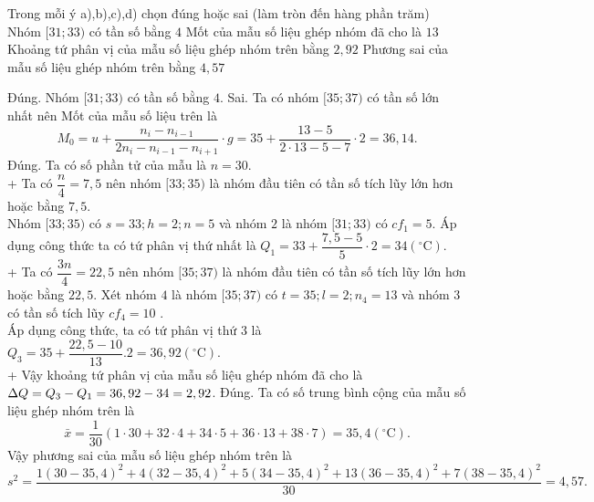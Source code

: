 \begin{ex}
	Trong mỗi ý a),b),c),d) chọn đúng hoặc sai (làm tròn đến hàng phần trăm)
	\choiceTF
	{\True Nhóm $[31 ; 33)$ có tần số bằng $4$}
	{Mốt của mẫu số liệu ghép nhóm đã cho là $13$}
	{\True Khoảng tứ phân vị của mẫu số liệu ghép nhóm trên bằng $2{,}92$}
	{\True  Phương sai của mẫu số liệu ghép nhóm trên bằng $4{,}57$}
	\loigiai
	{
		\begin{itemchoice}
			\itemch  Đúng. Nhóm $[31 ; 33)$ có tần số bằng $4$.
			\itemch  Sai. Ta có nhóm $[35 ; 37)$ có tần số lớn nhất nên Mốt của mẫu số liệu trên là $$M_0=u+\dfrac{n_i-n_{i-1}}{2 n_i-n_{i-1}-n_{i+1}} \cdot g=35+\dfrac{13-5}{2 \cdot 13-5-7} \cdot 2=36{,}14.$$
			\itemch Đúng. Ta có số phần tử của mẫu là $n=30$.\\
			+ Ta có $\dfrac{n}{4}=7,5$ nên nhóm $[33 ; 35)$ là nhóm đầu tiên có tần số tích lũy lớn hơn hoặc bằng $7,5$.\\
			Nhóm $[33 ; 35)$ có $s=33 ; h=2 ; n=5$ và nhóm $2$ là nhóm $[31 ; 33)$ có $c f_1=5$. Áp dụng công thức ta có tứ phân vị thứ nhất là $Q_1=33+\dfrac{7,5-5}{5} \cdot 2=34\left({ }^{\circ} \mathrm{C}\right)$.\\
			+ Ta có $\dfrac{3 n}{4}=22,5$ nên nhóm $[35 ; 37)$ là nhóm đầu tiên có tần số tích lũy lớn hơn hoặc bằng $22,5$.
			Xét nhóm $4$ là nhóm $[35 ; 37)$ có $t=35 ; l=2 ; n_4=13$ và nhóm $3$ có tần số tích lũy $c f_4=10$ .\\
			Áp dụng công thức, ta có tứ phân vị thứ 3 là $Q_3=35+\dfrac{22,5-10}{13} .2=36,92\left({ }^{\circ} \mathrm{C}\right)$.\\
			+ Vậy khoảng tứ phân vị của mẫu số liệu ghép nhóm đã cho là $\break \Delta Q=Q_3-Q_1=36,92-34=2,92$.
			\itemch Đúng. Ta có số trung bình cộng của mẫu số liệu ghép nhóm trên là $$\bar{x}=\dfrac{1}{30}(1\cdot30+32\cdot4+34
			\cdot5+36\cdot13+38\cdot7)=35{,}4\left({ }^{\circ} \mathrm{C}\right).$$
			Vậy phương sai của mẫu số liệu ghép nhóm trên là $$s^2=\dfrac{1(30-35{,}4)^2+4(32-35{,}4)^2+5(34-35{,}4)^2+13(36-35{,}4)^2+7(38-35{,}4)^2}{30}=4{,}57.$$
		\end{itemchoice}
	}
\end{ex}

